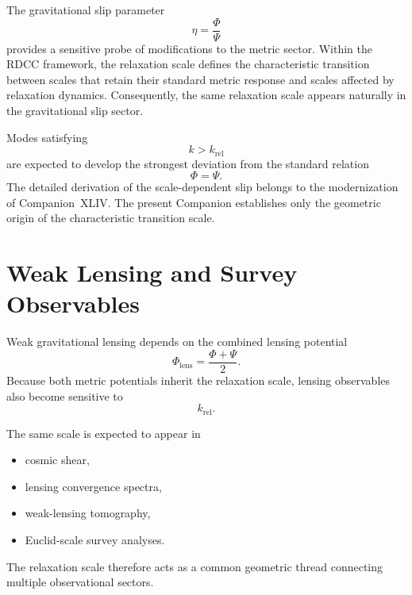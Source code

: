 \documentclass[11pt,a4paper]{article}
\begin{document}
The gravitational slip parameter
\begin{equation}
  \eta
  =
  \frac{\Phi}{\Psi}
\end{equation}
provides a sensitive probe of modifications to the metric sector. Within the
RDCC framework, the relaxation scale defines the characteristic transition
between scales that retain their standard metric response and scales affected
by relaxation dynamics. Consequently, the same relaxation scale appears
naturally in the gravitational slip sector.

Modes satisfying
\begin{equation}
  k > k_{\mathrm{rel}}
\end{equation}
are expected to develop the strongest deviation from the standard relation
\begin{equation}
  \Phi = \Psi.
\end{equation}
The detailed derivation of the scale-dependent slip belongs to the
modernization of Companion~XLIV. The present Companion establishes only the
geometric origin of the characteristic transition scale.

\section{Weak Lensing and Survey Observables}

Weak gravitational lensing depends on the combined lensing potential
\begin{equation}
  \Phi_{\mathrm{lens}}
  =
  \frac{\Phi + \Psi}{2}.
\end{equation}
Because both metric potentials inherit the relaxation scale, lensing
observables also become sensitive to
\begin{equation}
  k_{\mathrm{rel}}.
\end{equation}

The same scale is expected to appear in
\begin{itemize}
  \item cosmic shear,
  \item lensing convergence spectra,
  \item weak-lensing tomography,
  \item Euclid-scale survey analyses.
\end{itemize}
The relaxation scale therefore acts as a common geometric thread connecting
multiple observational sectors.
\end{document}
